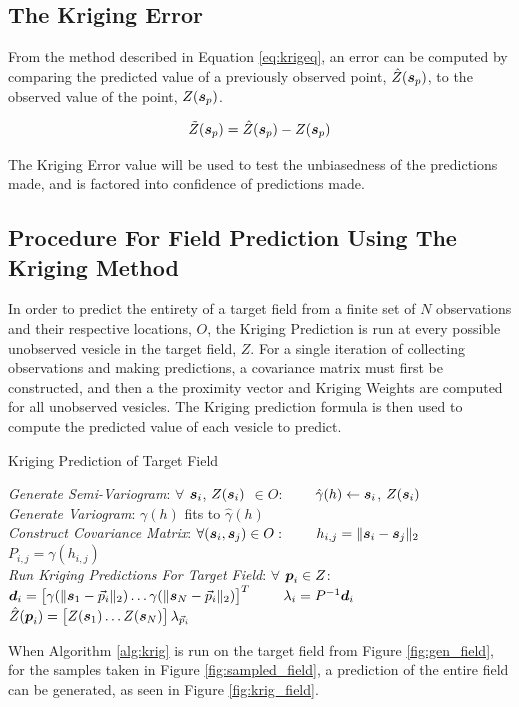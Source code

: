 \subsection{The Kriging Error}
From the method described in Equation \ref{eq:krigeq}, an error can be computed by comparing the predicted value of a previously observed point, $\hat{Z}({\it{\boldsymbol{s}}}_p)$, to the observed value of the point, $Z({\it{\boldsymbol{s}}}_p)$.

\begin{equation}
    \tilde{Z}({\it{\boldsymbol{s}}}_p) = \hat{Z}({\it{\boldsymbol{s}}}_p) - Z({\it{\boldsymbol{s}}}_p) 
    \label{eq:krigerr}
\end{equation}

The Kriging Error value will be used to test the unbiasedness of the predictions made, and is factored into confidence of predictions made.

\subsection{Procedure For Field Prediction Using The Kriging Method}
In order to predict the entirety of a target field from a finite set of $N$ observations and their respective locations, $O$, the Kriging Prediction is run at every possible unobserved vesicle in the target field, $Z$. For a single iteration of collecting observations and making predictions, a covariance matrix must first be constructed, and then a the proximity vector and Kriging Weights are computed for all unobserved vesicles. The Kriging prediction formula is then used to compute the predicted value of each vesicle to predict.

\begin{algorithm}[thpb!]
\caption{Kriging Prediction of Target Field}\label{alg:krig}
\begin{algorithmic}[1]
\BState \emph{Generate Semi-Variogram}:
\State $\forall$ ${\it{\boldsymbol{s}}}_i$, $Z({\it{\boldsymbol{s}}}_i)$ $\in O$:
\State \ \ \ \ $\hat{\gamma}(h) \gets {\it{\boldsymbol{s}}}_i$, $Z({\it{\boldsymbol{s}}}_i)$\\
\BState \emph{Generate Variogram}:
\State $\gamma(h)$ fits to $\hat{\gamma}(h)$\\
\BState \emph{Construct Covariance Matrix}:
\State $\forall ({\it{\boldsymbol{s}}}_i,{\it{\boldsymbol{s}}}_j) \in O:$
\State \ \ \ \ $h_{i,j} = \|{\it{\boldsymbol{s}}}_i - {\it{\boldsymbol{s}}}_j\|_2$
\State \ \ \ \ $P_{i,j} = \gamma(h_{i,j})$\\
\BState \emph{Run Kriging Predictions For Target Field}:
\State $\forall$ ${\it{\boldsymbol{p}}}_i \in Z$:
\State \ \ \ \ ${\it{\boldsymbol{d}}}_{i} = \begin{bmatrix} \gamma(\| {\it{\boldsymbol{s}}}_1 - \vec{p}_i \|_2) \dots \gamma(\| {\it{\boldsymbol{s}}}_N - \vec{p}_i \|_2) \end{bmatrix}^T$
\State \ \ \ \ $\lambda_{i} = P^{-1}{\it{\boldsymbol{d}}}_{i}$
\State \ \ \ \ $\hat{Z}({\it{\boldsymbol{p}}}_i) = \begin{bmatrix} Z({\it{\boldsymbol{s}}}_1) \dots Z({\it{\boldsymbol{s}}}_N) \end{bmatrix} \lambda_{\vec{p}_i}$
\EndProcedure
\end{algorithmic}
\end{algorithm}

When Algorithm \ref{alg:krig} is run on the target field from Figure \ref{fig:gen_field}, for the samples taken in Figure \ref{fig:sampled_field}, a prediction of the entire field can be generated, as seen in Figure \ref{fig:krig_field}.
